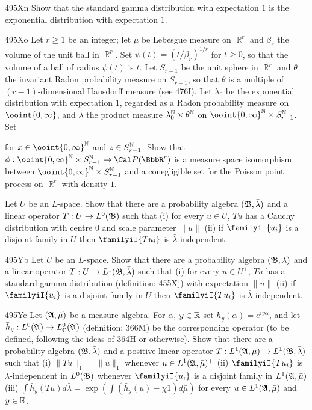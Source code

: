 {\spheader 495Xn Show that the standard gamma distribution with
expectation $1$ is the exponential distribution with expectation $1$.

\spheader 495Xo Let $r\ge 1$ be an integer;  let $\mu$ be Lebesgue
measure on $\BbbR^r$ and $\beta_r$ the volume of the unit ball in
$\BbbR^r$.   Set $\psi(t)=(t/\beta_r)^{1/r}$ for $t\ge 0$, so that the
volume of a ball of radius $\psi(t)$ is $t$.   Let $S_{r-1}$ be the unit
sphere in $\BbbR^r$ and $\theta$ the invariant Radon probability measure
on $S_{r-1}$, so that $\theta$ is a multiple of $(r-1)$-dimensional
Hausdorff measure (see 476I).   Let $\lambda_0$ be the exponential
distribution with expectation $1$, regarded as a Radon probability
measure on $\ooint{0,\infty}$, and $\lambda$ the product measure
$\lambda_0^{\Bbb N}\times\theta^{\Bbb N}$ on
$\ooint{0,\infty}^{\Bbb N}\times S_{r-1}^{\Bbb N}$.   Set


\noindent for $x\in\ooint{0,\infty}^{\Bbb N}$ and
$z\in S_{r-1}^{\Bbb N}$.   Show that
$\phi:\ooint{0,\infty}^{\Bbb N}\times S_{r-1}^{\Bbb N}
\to\Cal P(\BbbR^r)$ is a measure space isomorphism between
$\ooint{0,\infty}^{\Bbb N}\times S_{r-1}^{\Bbb N}$ and a conegligible
set for the Poisson point process on $\BbbR^r$ with density $1$.

Let $U$ be an $L$-space.   Show that there are a
probability algebra $(\frak B,\bar\lambda)$ and a linear operator
$T:U\to L^0(\frak B)$ such that (i) for every
$u\in U$, $Tu$ has a Cauchy distribution with centre
$0$ and scale parameter $\|u\|$ (ii) if $\familyiI{u_i}$ is a disjoint
family in $U$ then $\familyiI{Tu_i}$ is $\bar\lambda$-independent.

\spheader 495Yb Let $U$ be an $L$-space.   Show
that there are a probability algebra $(\frak B,\bar\lambda)$ and a
linear operator $T:U\to L^1(\frak B,\bar\lambda)$ such that (i)
for every $u\in U^+$, $Tu$ has a standard gamma distribution (definition:
455Xj) with expectation $\|u\|$ (ii) if
$\familyiI{u_i}$ is a disjoint family in $U$ then
$\familyiI{Tu_i}$ is $\bar\lambda$-independent.

\spheader 495Yc Let $(\frak A,\bar\mu)$ be a measure algebra.   For
$\alpha$, $y\in\Bbb R$ set $h_y(\alpha)=e^{iy\alpha}$, and let
$\bar h_y:L^0(\frak A)\to L^0_{\Bbb C}(\frak A)$ (definition: 
366M) be
the corresponding operator (to be defined, following the ideas of
364H
or otherwise).    Show that there are a probability algebra
$(\frak B,\bar\lambda)$ and a positive linear operator
$T:L^1(\frak A,\bar\mu)\to L^1(\frak B,\bar\lambda)$ such that
(i) $\|Tu\|_1=\|u\|_1$ whenever $u\in L^1(\frak A,\bar\mu)^+$ (ii)
$\familyiI{Tu_i}$ is $\bar\lambda$-independent in $L^0(\frak B)$
whenever $\familyiI{u_i}$ is a disjoint family in
$L^1(\frak A,\bar\mu)$ (iii)
$\int\bar h_y(Tu)d\bar\lambda=\exp(\int(\bar h_y(u)-\chi 1)d\bar\mu)$
for every $u\in L^1(\frak A,\bar\mu)$ and $y\in\Bbb R$.

}
